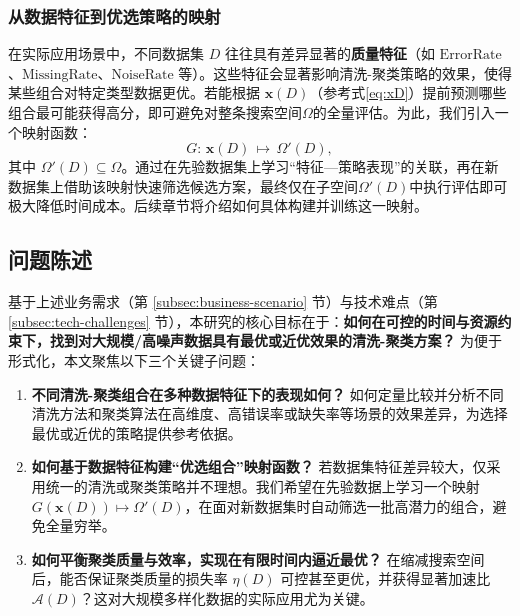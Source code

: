 \documentclass[10pt]{article} %
\numberwithin{equation}{section}
\begin{document}
\subsubsection{从数据特征到优选策略的映射}
在实际应用场景中，不同数据集 \(D\) 往往具有差异显著的\textbf{质量特征}（如 \(\mathrm{ErrorRate}\)、\(\mathrm{MissingRate}\)、\(\mathrm{NoiseRate}\) 等）。这些特征会显著影响清洗-聚类策略的效果，使得某些组合对特定类型数据更优。若能根据 \(\mathbf{x}(D)\)（参考式\eqref{eq:xD}）提前预测哪些组合最可能获得高分，即可避免对整条搜索空间\(\Omega\)的全量评估。为此，我们引入一个映射函数：
\begin{equation}\label{eq:Omega-prime}
  G:\, \mathbf{x}(D)\,\mapsto\, \Omega'(D),
\end{equation}
其中 \(\Omega'(D)\subseteq \Omega\)。通过在先验数据集上学习“特征—策略表现”的关联，再在新数据集上借助该映射快速筛选候选方案，最终仅在子空间\(\Omega'(D)\)中执行评估即可极大降低时间成本。后续章节将介绍如何具体构建并训练这一映射。

\subsection{问题陈述}\label{subsec:problem-statement}
基于上述业务需求（第 \ref{subsec:business-scenario} 节）与技术难点（第 \ref{subsec:tech-challenges} 节），本研究的核心目标在于：\textbf{如何在可控的时间与资源约束下，找到对大规模/高噪声数据具有最优或近优效果的清洗-聚类方案？} 为便于形式化，本文聚焦以下三个关键子问题：

\begin{enumerate}[label=\textbf{(Q\arabic*)},leftmargin=15pt]
    \item \textbf{不同清洗-聚类组合在多种数据特征下的表现如何？}  
    如何定量比较并分析不同清洗方法和聚类算法在高维度、高错误率或缺失率等场景的效果差异，为选择最优或近优的策略提供参考依据。

    \item \textbf{如何基于数据特征构建“优选组合”映射函数？}  
    若数据集特征差异较大，仅采用统一的清洗或聚类策略并不理想。我们希望在先验数据上学习一个映射 \(G(\mathbf{x}(D))\mapsto \Omega'(D)\)，在面对新数据集时自动筛选一批高潜力的组合，避免全量穷举。

    \item \textbf{如何平衡聚类质量与效率，实现在有限时间内逼近最优？}  
    在缩减搜索空间后，能否保证聚类质量的损失率 \(\eta(D)\) 可控甚至更优，并获得显著加速比 \(\mathcal{A}(D)\)？这对大规模多样化数据的实际应用尤为关键。
\end{enumerate}
\end{document}
